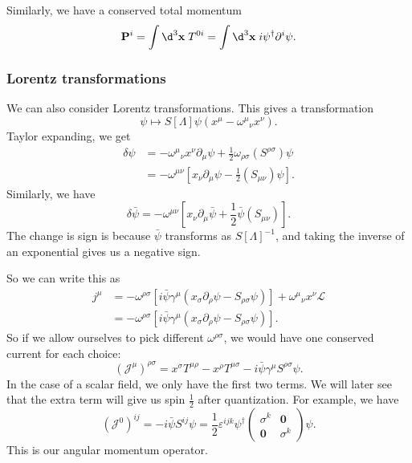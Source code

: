 \documentclass[a4paper]{article}
\begin{document}
Similarly, we have a conserved total momentum
\[
  \mathbf{P}^i = \int \d^3 \mathbf{x}\; T^{0i} = \int \d^3 \mathbf{x}\; i \psi^\dagger \partial^i \psi.
\]

\subsubsection*{Lorentz transformations}
We can also consider Lorentz transformations. This gives a transformation
\[
  \psi \mapsto S[\Lambda] \psi(x^\mu - \omega^\mu\!_\nu x^\nu).
\]
Taylor expanding, we get
\begin{align*}
  \delta \psi &=- \omega^\mu\!_\nu x^\nu \partial_\mu \psi + \frac{1}{2} \omega_{\rho\sigma} (S^{\rho\sigma}) \psi\\
  &= - \omega^{\mu\nu}\left[x_\nu \partial_\mu \psi - \frac{1}{2}(S_{\mu\nu}) \psi\right].
\end{align*}
Similarly, we have
\[
  \delta \bar\psi = - \omega^{\mu\nu} \left[x_\nu \partial_\mu \bar\psi + \frac{1}{2} \bar\psi (S_{\mu\nu})\right].
\]
The change is sign is because $\bar\psi$ transforms as $S[\Lambda]^{-1}$, and taking the inverse of an exponential gives us a negative sign.

So we can write this as
\begin{align*}
  j^\mu &= - \omega^{\rho\sigma}\left[i \bar\psi \gamma^\mu (x_\sigma \partial_\rho \psi - S_{\rho\sigma} \psi)\right] + \omega^\mu\!_\nu x^\nu \mathcal{L}\\
  &= - \omega^{\rho\sigma}\left[i \bar\psi \gamma^\mu (x_\sigma \partial_\rho \psi - S_{\rho\sigma} \psi)\right].
\end{align*}
So if we allow ourselves to pick different $\omega^{\rho\sigma}$, we would have one conserved current for each choice:
\[
  (\mathcal{J}^\mu)^{\rho\sigma} = x^\sigma T^{\mu\rho} - x^\rho T^{\mu\sigma} - i \bar\psi \gamma^\mu S^{\rho\sigma} \psi.
\]
In the case of a scalar field, we only have the first two terms. We will later see that the extra term will give us spin $\frac{1}{2}$ after quantization. For example, we have
\[
  (\mathcal{J}^0)^{ij} = -i \bar\psi S^{ij} \psi = \frac{1}{2} \varepsilon^{ijk}\psi^\dagger
  \begin{pmatrix}
    \sigma^k & \mathbf{0}\\
    \mathbf{0} & \sigma^k
  \end{pmatrix}\psi.
\]
This is our angular momentum operator.
\end{document}

